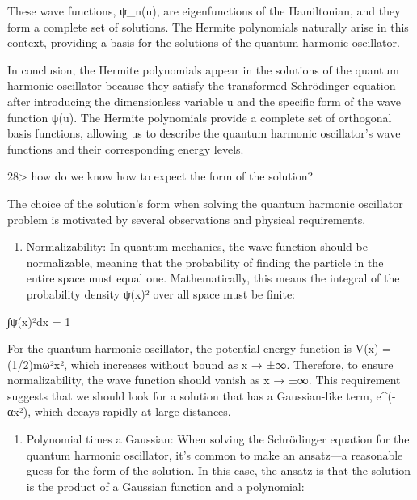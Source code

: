 \documentclass[
]{article}
\providecommand{\tightlist}{%
  \setlength{\itemsep}{0pt}\setlength{\parskip}{0pt}}
\begin{document}
These wave functions, ψ\_n(u), are eigenfunctions of the Hamiltonian,
and they form a complete set of solutions. The Hermite polynomials
naturally arise in this context, providing a basis for the solutions of
the quantum harmonic oscillator.

In conclusion, the Hermite polynomials appear in the solutions of the
quantum harmonic oscillator because they satisfy the transformed
Schrödinger equation after introducing the dimensionless variable u and
the specific form of the wave function ψ(u). The Hermite polynomials
provide a complete set of orthogonal basis functions, allowing us to
describe the quantum harmonic oscillator's wave functions and their
corresponding energy levels.

28\textgreater{} how do we know how to expect the form of the solution?

The choice of the solution's form when solving the quantum harmonic
oscillator problem is motivated by several observations and physical
requirements.

\begin{enumerate}
\def\labelenumi{\arabic{enumi}.}
\tightlist
\item
  Normalizability: In quantum mechanics, the wave function should be
  normalizable, meaning that the probability of finding the particle in
  the entire space must equal one. Mathematically, this means the
  integral of the probability density \textbar ψ(x)\textbar² over all
  space must be finite:
\end{enumerate}

∫\textbar ψ(x)\textbar²dx = 1

For the quantum harmonic oscillator, the potential energy function is
V(x) = (1/2)mω²x², which increases without bound as x → ±∞. Therefore,
to ensure normalizability, the wave function should vanish as x → ±∞.
This requirement suggests that we should look for a solution that has a
Gaussian-like term, e\^{}(-αx²), which decays rapidly at large
distances.

\begin{enumerate}
\def\labelenumi{\arabic{enumi}.}
\setcounter{enumi}{1}
\tightlist
\item
  Polynomial times a Gaussian: When solving the Schrödinger equation for
  the quantum harmonic oscillator, it's common to make an ansatz---a
  reasonable guess for the form of the solution. In this case, the
  ansatz is that the solution is the product of a Gaussian function and
  a polynomial:
\end{enumerate}
\end{document}
